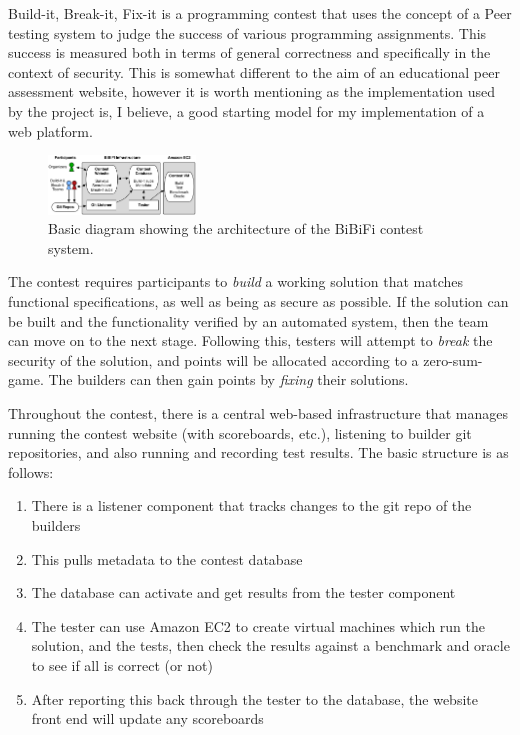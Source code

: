 \documentclass[a4paper,11pt]{report}
\begin{document}
Build-it, Break-it, Fix-it\cite{ruef_build_2016} is a programming contest that uses the concept of a Peer testing system to judge the success of various programming assignments. This success is measured both in terms of general correctness and specifically in the context of security. This is somewhat different to the aim of an educational peer assessment website, however it is worth mentioning as the implementation used by the project is, I believe, a good starting model for my implementation of a web platform.\par
\begin{figure}
\centering
\includegraphics[width=0.35\textwidth]{bibifi.png}
\caption{\footnotesize Basic diagram showing the architecture of the BiBiFi contest system.}
\end{figure}
The contest requires participants to \textit{build} a working solution that matches functional specifications, as well as being as secure as possible. If the solution can be built and the functionality verified by an automated system, then the team can move on to the next stage. Following this, testers will attempt to \textit{break} the security of the solution, and points will be allocated according to a zero-sum-game. The builders can then gain points by \textit{fixing} their solutions.\par
Throughout the contest, there is a central web-based infrastructure that manages running the contest website (with scoreboards, etc.), listening to builder git repositories, and also running and recording test results. The basic structure is as follows:
\begin{enumerate}
 \item There is a listener component that tracks changes to the git repo of the builders
 \item This pulls metadata to the contest database
 \item The database can activate and get results from the tester component
 \item The tester can use Amazon EC2 to create virtual machines which run the solution, and the tests, then check the results against a benchmark and oracle to see if all is correct (or not)
 \item After reporting this back through the tester to the database, the website front end will update any scoreboards
\end{enumerate}
\end{document}
